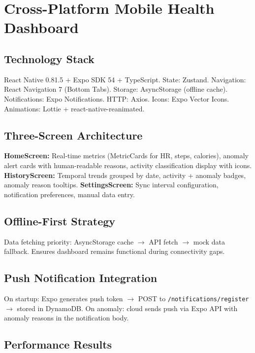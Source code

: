 \section{Cross-Platform Mobile Health Dashboard}

\subsection{Technology Stack}
React Native 0.81.5 + Expo SDK 54 + TypeScript. State: Zustand. Navigation: React Navigation 7 (Bottom Tabs). Storage: AsyncStorage (offline cache). Notifications: Expo Notifications. HTTP: Axios. Icons: Expo Vector Icons. Animations: Lottie + react-native-reanimated.

\subsection{Three-Screen Architecture}
\textbf{HomeScreen:} Real-time metrics (MetricCards for HR, steps, calories), anomaly alert cards with human-readable reasons, activity classification display with icons. \textbf{HistoryScreen:} Temporal trends grouped by date, activity + anomaly badges, anomaly reason tooltips. \textbf{SettingsScreen:} Sync interval configuration, notification preferences, manual data entry.

\subsection{Offline-First Strategy}
Data fetching priority: AsyncStorage cache $\rightarrow$ API fetch $\rightarrow$ mock data fallback. Ensures dashboard remains functional during connectivity gaps.

\subsection{Push Notification Integration}
On startup: Expo generates push token $\rightarrow$ POST to \texttt{/notifications/register} $\rightarrow$ stored in DynamoDB. On anomaly: cloud sends push via Expo API with anomaly reasons in the notification body.

\subsection{Performance Results}

